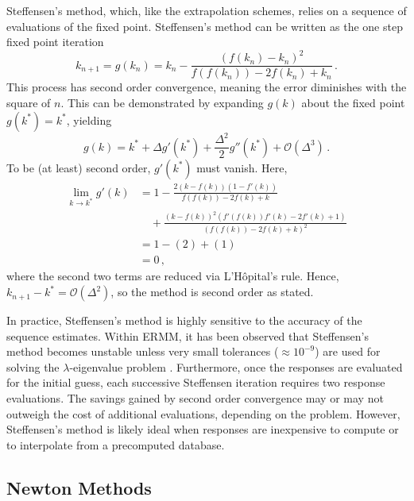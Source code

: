Steffensen's method, which,
like the extrapolation schemes, relies on a sequence of evaluations 
of the fixed point.
Steffensen's method can be written as the one step fixed point iteration
\begin{equation}
 k_{n+1} = g(k_n) = k_{n} - \frac{(f(k_n) - k_n)^2} 
                     {f(f(k_n)) - 2 f(k_n) + k_n}  \, .
\end{equation}
This process has second order convergence, meaning the error 
diminishes with the square of $n$.  This can be 
demonstrated by expanding $g(k)$ about the fixed point $g(k^*)=k^*$, yielding
\begin{equation}
 g(k) = k^* + \Delta g'(k^*) + \frac{\Delta^2}{2} g''(k^*) 
               + \mathcal{O}(\Delta^3) \, .
\end{equation}
To be (at least) second order, $g'(k^*)$ must vanish.  Here,
\begin{equation}
\begin{split}
  \lim_{k\to k^*}
    g'(k) &= 1 - \frac{2(k-f(k))(1-f'(k))}
                      {f(f(k))-2f(k)+k}\\
          & \quad + \frac{(k-f(k))^2(f'(f(k))f'(k) - 2f'(k)+1)}
                      {(f(f(k))-2f(k)+k)^2} \\
          &= 1 - (2) + (1) \\
          &= 0 \, ,
\end{split}
\end{equation}
where the second two terms are reduced via L'H\^{o}pital's rule.  Hence,
$k_{n+1} - k^* = \mathcal{O}(\Delta^2)$, so the method is second 
order as stated.

In practice, Steffensen's method is highly sensitive to the 
accuracy of the sequence estimates.  Within ERMM, it
has been observed that Steffensen's method becomes unstable
unless very small tolerances ($\approx 10^{-9}$) are used 
for solving the $\lambda$-eigenvalue problem \cite{roberts2012ksi}.
Furthermore,  once the responses are evaluated for the initial
guess, each successive Steffensen iteration requires two response 
evaluations. 
The savings gained by second order convergence 
may or may not outweigh the cost of additional evaluations, depending 
on the problem.   However,  Steffensen's method 
is likely ideal when responses are inexpensive to 
compute or to interpolate from a precomputed database.

\subsection{Newton Methods}

